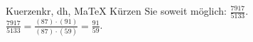 \begin{MAufgabe}{Kuerzen}{kr, dh, MaTeX}
K\"urzen Sie soweit m\"oglich: $\frac{7917}{5133}$.\\ 
\ifLsg\MLoesung
\quad $\frac{7917}{5133}=\frac{(87)\cdot(91)}{(87)\cdot(59)}=\frac{91}{59}$.\else\relax\fi
 \end{MAufgabe}